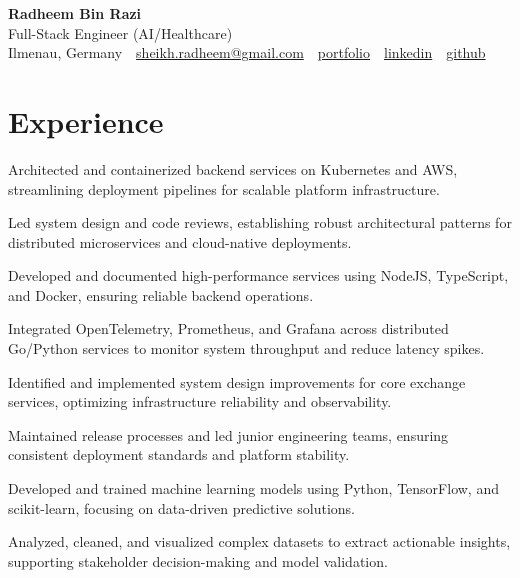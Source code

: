 \documentclass[10pt,a4paper]{resume}
\makeatletter
\newcommand{\Portfolio}{https://radheem.github.io/my-cv}
\newcommand{\PortfolioText}{portfolio}
\newcommand{\GitHub}{https://github.com/radheem}
\newcommand{\LinkedIn}{https://www.linkedin.com/in/radheem-razi}
\newcommand{\Email}{sheikh.radheem@gmail.com}
\makeatother
\begin{document}
\begin{center}
  {\huge\bfseries Radheem Bin Razi}\\[3pt]
  {\large Full-Stack Engineer (AI/Healthcare)}\\[6pt]
  \small
  Ilmenau, Germany \,\textbar\,
  \href{mailto:\Email}{\Email} \,\textbar\,
  \href{\Portfolio}{\PortfolioText} \,\textbar\,
  \href{\LinkedIn}{linkedin} \,\textbar\,
  \href{\GitHub}{github}
\end{center}
\vspace{2pt}

\section{Experience}

\bullets
  \item Architected and containerized backend services on Kubernetes and AWS, streamlining deployment pipelines for scalable platform infrastructure.
  \item Led system design and code reviews, establishing robust architectural patterns for distributed microservices and cloud-native deployments.
  \item Developed and documented high-performance services using NodeJS, TypeScript, and Docker, ensuring reliable backend operations.
\bulletsend
\vspace{1.5pt}
\bullets
  \item Integrated OpenTelemetry, Prometheus, and Grafana across distributed Go/Python services to monitor system throughput and reduce latency spikes.
  \item Identified and implemented system design improvements for core exchange services, optimizing infrastructure reliability and observability.
  \item Maintained release processes and led junior engineering teams, ensuring consistent deployment standards and platform stability.
\bulletsend
\vspace{1.5pt}
\bullets
  \item Developed and trained machine learning models using Python, TensorFlow, and scikit-learn, focusing on data-driven predictive solutions.
  \item Analyzed, cleaned, and visualized complex datasets to extract actionable insights, supporting stakeholder decision-making and model validation.
\bulletsend
\vspace{1.5pt}
\end{document}
